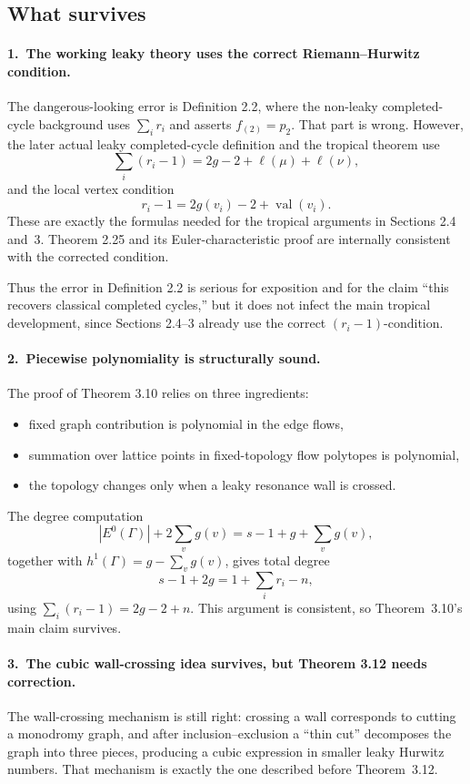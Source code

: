 \documentclass[11pt]{article}
\newcommand{\ellp}{\ell}
\begin{document}
\subsection*{What survives}

\paragraph{1.\ The working leaky theory uses the correct Riemann--Hurwitz condition.}
The dangerous-looking error is Definition 2.2, where the non-leaky completed-cycle background uses $\sum_i r_i$ and asserts $f_{(2)}=p_2$.  That part is wrong.  However, the later actual leaky completed-cycle definition and the tropical theorem use
\[
   \sum_i (r_i-1) = 2g-2+\ellp(\mu)+\ellp(\nu),
\]
and the local vertex condition
\[
   r_i - 1 = 2g(v_i) - 2 + \operatorname{val}(v_i).
\]
These are exactly the formulas needed for the tropical arguments in Sections 2.4 and~3.  Theorem 2.25 and its Euler-characteristic proof are internally consistent with the corrected condition.

Thus the error in Definition 2.2 is serious for exposition and for the claim ``this recovers classical completed cycles,'' but it does not infect the main tropical development, since Sections 2.4--3 already use the correct $(r_i-1)$-condition.

\paragraph{2.\ Piecewise polynomiality is structurally sound.}
The proof of Theorem 3.10 relies on three ingredients:
\begin{itemize}
   \item fixed graph contribution is polynomial in the edge flows,
   \item summation over lattice points in fixed-topology flow polytopes is polynomial,
   \item the topology changes only when a leaky resonance wall is crossed.
\end{itemize}
The degree computation
\[
   |E^0(\Gamma)| + 2\sum_v g(v) = s - 1 + g + \sum_v g(v),
\]
together with $h^1(\Gamma)=g-\sum_v g(v)$, gives total degree
\[
   s - 1 + 2g = 1 + \sum_i r_i - n,
\]
using $\sum_i(r_i-1) = 2g-2+n$.  This argument is consistent, so Theorem~3.10's main claim survives.

\paragraph{3.\ The cubic wall-crossing idea survives, but Theorem 3.12 needs correction.}
The wall-crossing mechanism is still right: crossing a wall corresponds to cutting a monodromy graph, and after inclusion--exclusion a ``thin cut'' decomposes the graph into three pieces, producing a cubic expression in smaller leaky Hurwitz numbers.  That mechanism is exactly the one described before Theorem~3.12.
\end{document}
